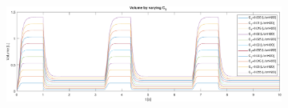\begin{figure}[t!]
\begin{subfigure}{0.5\linewidth}
		\caption{}
	\end{subfigure}\hfill
	\caption{}
	\begin{subfigure}{\linewidth}
		\centering
		\includegraphics[width=0.95\linewidth]{../model/data_log/CwCL_volume_total.pdf}
		\caption{}
	\end{subfigure}\hfill
	\caption{}
\end{figure}


